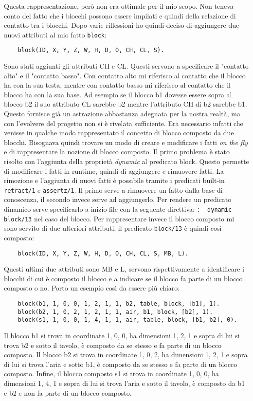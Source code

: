 Questa rappresentazione, però non era ottimale per il mio scopo. Non teneva conto del fatto che i blocchi possono essere impilati e quindi della relazione di contatto tra i blocchi. Dopo varie riflessioni ho quindi deciso di aggiungere due nuovi attributi al mio fatto \verb+block+:
\begin{verbatim}
    block(ID, X, Y, Z, W, H, D, O, CH, CL, S).
\end{verbatim}
Sono stati aggiunti gli attributi CH e CL. Questi servono a specificare il "contatto alto" e il "contatto basso". Con contatto alto mi riferisco al contatto che il blocco ha con la sua testa, mentre con contatto basso mi riferisco al contatto che il blocco ha con la sua base. Ad esempio se il blocco b1 dovesse essere sopra al blocco b2 il suo attributo CL sarebbe b2 mentre l'attributo CH di b2 sarebbe b1. Questo fornisce già un astrazione abbastanza adeguata per la nostra realtà, ma con l'evolvere del progetto non si è rivelata sufficiente.
Era necessario infatti che venisse in qualche modo rappresentato il concetto di blocco composto da due blocchi. Bisognava quindi trovare un modo di creare e modificare i fatti \textit{on the fly} e di rappresentare la nozione di blocco composto.
Il primo problema è stato risolto con l'aggiunta della proprietà \textit{dynamic} al predicato block. Questo permette di modificare i fatti in runtime, quindi di aggiungere e rimuovere fatti. La rimozione e l'aggiunta di nuovi fatti è possibile tramite i predicati built-in \verb+retract/1+ e \verb+assertz/1+. Il primo serve a rimuovere un fatto dalla base di conoscenza, il secondo invece serve ad aggiungerlo.
Per rendere un predicato dinamico serve specificarlo a inizio file con la seguente direttiva: \verb+:- dynamic block/13+ nel caso del blocco.
Per rappresentare invece il blocco composto mi sono servito di due ulteriori attributi, il predicato \verb+block/13+ è quindi così composto:
\begin{verbatim}
    block(ID, X, Y, Z, W, H, D, O, CH, CL, S, MB, L).
\end{verbatim}
Questi ultimi due attributi sono MB e L, servono rispettivamente a identificare i blocchi di cui è composto il blocco e a indicare se il blocco fa parte di un blocco composto o no. Porto un esempio così da essere più chiaro:
\begin{verbatim}
    block(b1, 1, 0, 0, 1, 2, 1, 1, b2, table, block, [b1], 1).
    block(b2, 1, 0, 2, 1, 2, 1, 1, air, b1, block, [b2], 1).
    block(s1, 1, 0, 0, 1, 4, 1, 1, air, table, block, [b1, b2], 0).
\end{verbatim}
Il blocco b1 si trova in coordinate 1, 0, 0, ha dimensioni 1, 2, 1 e sopra di lui si trova b2 e sotto il tavolo, è composto da se stesso e fa parte di un blocco composto.
Il blocco b2 si trova in coordinate 1, 0, 2, ha dimensioni 1, 2, 1 e sopra di lui si trova l'aria e sotto b1, è composto da se stesso e fa parte di un blocco composto.
Infine, il blocco composto s1 si trova in coordinate 1, 0, 0, ha dimensioni 1, 4, 1 e sopra di lui si trova l'aria e sotto il tavolo, è composto da b1 e b2 e non fa parte di un blocco composto.

